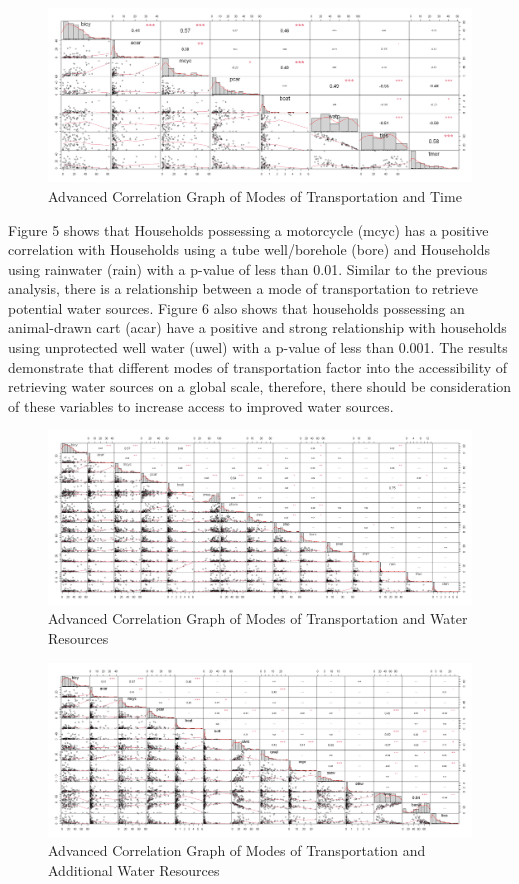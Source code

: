 \documentclass[10pt,twoside]{article}
\numberwithin{equation}{section}
\newcommand{\?}{\stackrel{?}{=}}
\begin{document}
\begin{figure}[h!]
  \centering
  \includegraphics[width=.7\textwidth]{transportation-time}
  \caption{Advanced Correlation Graph of Modes of Transportation and Time}
  \label{fig:transporation-time}
\end{figure}
Figure 5 shows that Households possessing a motorcycle (mcyc) has a positive correlation with Households using a tube well/borehole (bore) and Households using rainwater (rain) with a p-value of less than 0.01. Similar to the previous analysis, there is a relationship between a mode of transportation to retrieve potential water sources. Figure 6 also shows that households possessing an animal-drawn cart (acar) have a positive and strong relationship with households using unprotected well water (uwel) with a p-value of less than 0.001. The results demonstrate that different modes of transportation factor into the accessibility of retrieving water sources on a global scale, therefore, there should be consideration of these variables to increase access to improved water sources. 
\begin{figure}[h!]
  \centering
  \includegraphics[width=.7\textwidth]{transportation-water-1}
  \caption{Advanced Correlation Graph of Modes of Transportation and Water Resources}
  \label{fig:transporation-water}
\end{figure}

\begin{figure}[h!]
  \centering
  \includegraphics[width=.7\textwidth]{transportation-water-2}
  \caption{Advanced Correlation Graph of Modes of Transportation and Additional Water Resources}
  \label{fig:transporation-water}
\end{figure}
\end{document}

